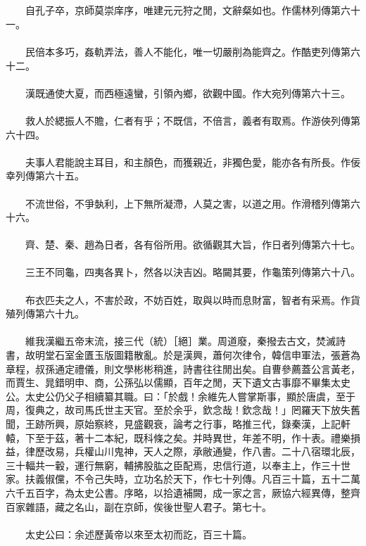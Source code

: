 \\\\
　　自孔子卒，京師莫崇庠序，唯建元元狩之閒，文辭粲如也。作儒林列傳第六十一。
\\\\
　　民倍本多巧，姦軌弄法，善人不能化，唯一切嚴削為能齊之。作酷吏列傳第六十二。
\\\\
　　漢既通使大夏，而西極遠蠻，引領內鄉，欲觀中國。作大宛列傳第六十三。
\\\\
　　救人於緦振人不贍，仁者有乎；不既信，不倍言，義者有取焉。作游俠列傳第六十四。
\\\\
　　夫事人君能說主耳目，和主顏色，而獲親近，非獨色愛，能亦各有所長。作佞幸列傳第六十五。
\\\\
　　不流世俗，不爭埶利，上下無所凝滯，人莫之害，以道之用。作滑稽列傳第六十六。
\\\\
　　齊、楚、秦、趙為日者，各有俗所用。欲循觀其大旨，作日者列傳第六十七。
\\\\
　　三王不同龜，四夷各異卜，然各以決吉凶。略闚其要，作龜策列傳第六十八。
\\\\
　　布衣匹夫之人，不害於政，不妨百姓，取與以時而息財富，智者有采焉。作貨殖列傳第六十九。
\\\\
　　維我漢繼五帝末流，接三代（統）［絕］業。周道廢，秦撥去古文，焚滅詩書，故明堂石室金匱玉版圖籍散亂。於是漢興，蕭何次律令，韓信申軍法，張蒼為章程，叔孫通定禮儀，則文學彬彬稍進，詩書往往閒出矣。自曹參薦蓋公言黃老，而賈生、晁錯明申、商，公孫弘以儒顯，百年之閒，天下遺文古事靡不畢集太史公。太史公仍父子相續纂其職。曰：「於戲！余維先人嘗掌斯事，顯於唐虞，至于周，復典之，故司馬氏世主天官。至於余乎，欽念哉！欽念哉！」罔羅天下放失舊聞，王跡所興，原始察終，見盛觀衰，論考之行事，略推三代，錄秦漢，上記軒轅，下至于茲，著十二本紀，既科條之矣。并時異世，年差不明，作十表。禮樂損益，律歷改易，兵權山川鬼神，天人之際，承敝通變，作八書。二十八宿環北辰，三十輻共一轂，運行無窮，輔拂股肱之臣配焉，忠信行道，以奉主上，作三十世家。扶義俶儻，不令己失時，立功名於天下，作七十列傳。凡百三十篇，五十二萬六千五百字，為太史公書。序略，以拾遺補闕，成一家之言，厥協六經異傳，整齊百家雜語，藏之名山，副在京師，俟後世聖人君子。第七十。
\\\\
　　太史公曰：余述歷黃帝以來至太初而訖，百三十篇。